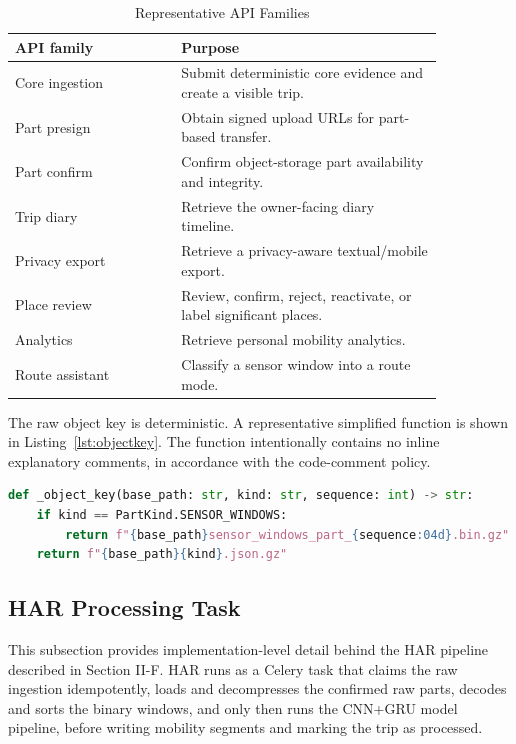 \documentclass[conference,a4paper]{IEEEtran}
\begin{document}
\begin{table}[htbp]
\caption{Representative API Families}
\begin{center}
\begin{tabular}{p{0.33\linewidth} p{0.52\linewidth}}
\toprule
\textbf{API family} & \textbf{Purpose}\\
\midrule
Core ingestion & Submit deterministic core evidence and create a visible trip.\\
Part presign & Obtain signed upload URLs for part-based transfer.\\
Part confirm & Confirm object-storage part availability and integrity.\\
Trip diary & Retrieve the owner-facing diary timeline.\\
Privacy export & Retrieve a privacy-aware textual/mobile export.\\
Place review & Review, confirm, reject, reactivate, or label significant places.\\
Analytics & Retrieve personal mobility analytics.\\
Route assistant & Classify a sensor window into a route mode.\\
\bottomrule
\end{tabular}
\label{tab:api}
\end{center}
\end{table}

The raw object key is deterministic. A representative simplified function is shown in Listing~\ref{lst:objectkey}. The function intentionally contains no inline explanatory comments, in accordance with the code-comment policy.

\begin{lstlisting}[language=Python,caption={Deterministic object key construction for ingestion parts.},label={lst:objectkey}]
def _object_key(base_path: str, kind: str, sequence: int) -> str:
    if kind == PartKind.SENSOR_WINDOWS:
        return f"{base_path}sensor_windows_part_{sequence:04d}.bin.gz"
    return f"{base_path}{kind}.json.gz"
\end{lstlisting}

\subsection{HAR Processing Task}

This subsection provides implementation-level detail behind the HAR pipeline described in Section II-F. HAR runs as a Celery task that claims the raw ingestion idempotently, loads and decompresses the confirmed raw parts, decodes and sorts the binary windows, and only then runs the CNN+GRU model pipeline, before writing mobility segments and marking the trip as processed.
\end{document}
